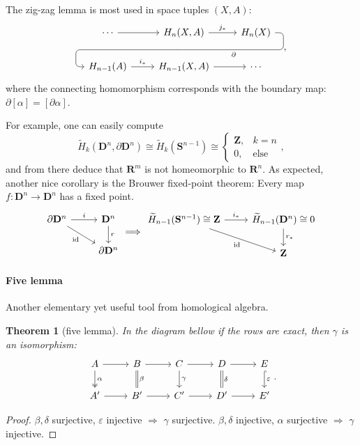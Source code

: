 \documentclass[11pt]{article}
\theoremstyle{definition}
\theoremstyle{plain}
\newtheorem{theorem}{Theorem}[section]
\newcommand{\id}{\textup{id}}
\newcommand{\R}{\mathbf{R}}
\newcommand{\Z}{\mathbf{Z}}
\newcommand{\s}{\mathbf{S}}
\begin{document}
The zig-zag lemma is most used in space tuples $(X,A)$:
\[\begin{tikzcd}
\cdots \arrow[r]
& H_n(X,A) \arrow{r}{j_\ast}
\arrow[d, phantom, ""{coordinate, name=Z}]
& H_n(X) \arrow[dll,
"\partial",
rounded corners,
to path={ -- ([xshift=2ex]\tikztostart.east)
|- (Z) [near end]\tikztonodes
-| ([xshift=-2ex]\tikztotarget.west)
-- (\tikztotarget)}] \\
H_{n-1}(A) \arrow{r}{i_\ast}
& H_{n-1}(X,A) \arrow[r]
& \cdots
\end{tikzcd},\]
where the connecting homomorphism corresponds with the boundary map: $\partial[\alpha]=[\partial\alpha]$.\medbreak

For example, one can easily compute
\[\widetilde{H}_k(\mathbf{D}^n,\partial\mathbf{D}^n)\cong \widetilde{H}_k(\s^{n-1})\cong\begin{cases}\Z,&k=n\\0,&\textrm{else}
\end{cases},\]
and from there deduce that $\R^m$ is not homeomorphic to $\R^n$. As expected, another nice corollary is the Brouwer fixed-point theorem: Every map $f:\mathbf{D}^n\to\mathbf{D}^n$ has a fixed point.
\[\begin{tikzcd}
\partial\mathbf{D}^n\arrow[swap]{dr}{\id}\arrow{r}{i}&\mathbf{D}^n\arrow{d}{r}\\
&\partial\mathbf{D}^n
\end{tikzcd}\Longrightarrow\begin{tikzcd}
\widetilde{H}_{n-1}(\mathbf{S}^{n-1})\cong\Z\arrow[swap]{dr}{\id}\arrow{r}{i_\ast}&\widetilde{H}_{n-1}(\mathbf{D}^n)\cong0\arrow{d}{r_\ast}\\
&\Z
\end{tikzcd}\]

\paragraph{Five lemma} Another elementary yet useful tool from homological algebra.

\begin{theorem}[five lemma]
In the diagram bellow if the rows are exact, then $\gamma$ is an isomorphism:
\[\begin{tikzcd}
A\arrow[r]\arrow[two heads]{d}{\alpha}&B\arrow[equal]{d}{\beta}\arrow[r]&C\arrow{d}{\gamma}\arrow[r]&D\arrow[equal]{d}{\delta}\arrow[r]&E\arrow[hook]{d}{\varepsilon}\\
A'\arrow[r]&B'\arrow[r]&C'\arrow[r]&D'\arrow[r]&E'
\end{tikzcd}.\]
\end{theorem}
\begin{proof}
$\beta,\delta$ surjective, $\varepsilon$ injective $\Rightarrow$ $\gamma$ surjective. $\beta,\delta$ injective, $\alpha$ surjective $\Rightarrow$ $\gamma$ injective.
\end{proof}
\end{document}
